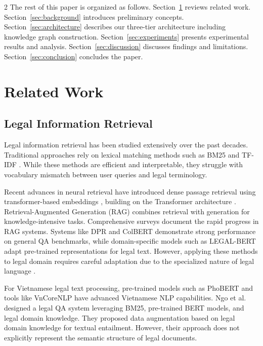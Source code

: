 \documentclass[11pt,a4paper]{article}
\begin{document}
\begin{multicols}{2}
The rest of this paper is organized as follows. Section~\ref{sec:related} reviews related work. Section~\ref{sec:background} introduces preliminary concepts. Section~\ref{sec:architecture} describes our three-tier architecture including knowledge graph construction. Section~\ref{sec:experiments} presents experimental results and analysis. Section~\ref{sec:discussion} discusses findings and limitations. Section~\ref{sec:conclusion} concludes the paper.

\section{Related Work}
\label{sec:related}

\subsection{Legal Information Retrieval}

Legal information retrieval has been studied extensively over the past decades. Traditional approaches rely on lexical matching methods such as BM25 and TF-IDF \cite{ref11}. While these methods are efficient and interpretable, they struggle with vocabulary mismatch between user queries and legal terminology.

Recent advances in neural retrieval have introduced dense passage retrieval using transformer-based embeddings \cite{ref3}, building on the Transformer architecture \cite{ref_vaswani}. Retrieval-Augmented Generation (RAG) \cite{ref2} combines retrieval with generation for knowledge-intensive tasks. Comprehensive surveys \cite{ref_gao2024,ref_fan2024} document the rapid progress in RAG systems. Systems like DPR and ColBERT demonstrate strong performance on general QA benchmarks, while domain-specific models such as LEGAL-BERT \cite{ref_chalkidis} adapt pre-trained representations for legal text. However, applying these methods to legal domain requires careful adaptation due to the specialized nature of legal language \cite{ref_zhong2020,ref_legalai2024}.

For Vietnamese legal text processing, pre-trained models such as PhoBERT \cite{ref_phobert} and tools like VnCoreNLP \cite{ref_vncorenlp} have advanced Vietnamese NLP capabilities. Ngo et al. \cite{ref7} designed a legal QA system leveraging BM25, pre-trained BERT \cite{ref13} models, and legal domain knowledge. They proposed data augmentation based on legal domain knowledge for textual entailment. However, their approach does not explicitly represent the semantic structure of legal documents.


\end{multicols}
\end{document}

